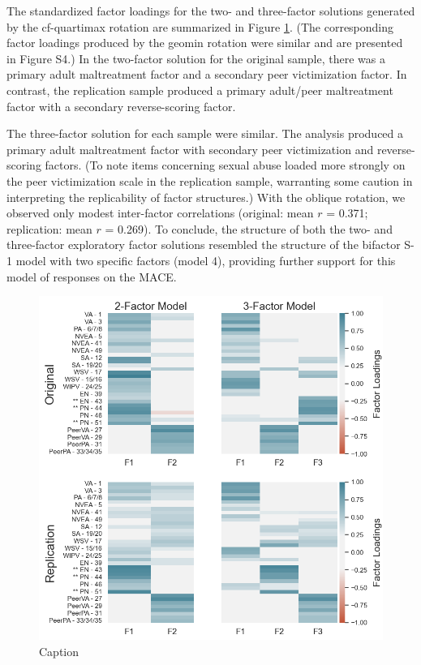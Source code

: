 \documentclass[letterpaper,man,natbib,floatsintext,longtable]{apa6}
\begin{document}
The standardized factor loadings for the two- and three-factor solutions generated by the cf-quartimax rotation are summarized in Figure \ref{fig:efa}. (The corresponding factor loadings produced by the geomin rotation were similar and are presented in Figure S4.) In the two-factor solution for the original sample, there was a primary adult maltreatment factor and a secondary peer victimization factor. In contrast, the replication sample produced a primary adult/peer maltreatment factor with a secondary reverse-scoring factor. 

The three-factor solution for each sample were similar. The analysis produced a primary adult maltreatment factor with secondary peer victimization and reverse-scoring factors. (To note items concerning sexual abuse loaded more strongly on the peer victimization scale in the replication sample, warranting some caution in interpreting the replicability of factor structures.) With the oblique rotation, we observed only modest inter-factor correlations (original: mean $r$ = 0.371; replication: mean $r$ = 0.269). To conclude, the structure of both the two- and three-factor exploratory factor solutions resembled the structure of the bifactor S-1 model with two specific factors (model 4), providing further support for this model of responses on the MACE. 

\begin{figure}[t!]
    \centering
    \includegraphics[width=1\textwidth,center]{figures/fig04.png}
    \caption{Caption}
    \label{fig:efa}
\end{figure}
\end{document}
